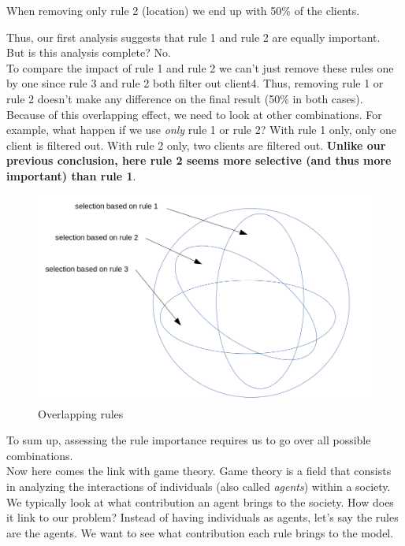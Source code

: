 When removing only rule 2 (location) we end up with 50\% of the clients.

Thus, our first analysis suggests that rule 1 and rule 2 are equally important. \\

But is this analysis complete? No. \\

To compare the impact of rule 1  and rule 2 we can't just remove these rules one by one since rule 3 and rule 2 both filter out client4. Thus, removing rule 1 or rule 2 doesn't make any difference on the final result (50\% in both cases). Because of this overlapping  effect, we need to look at other combinations. For example, what happen if we use \textit{only} rule 1 or rule 2? With rule 1 only, only one client is filtered out. With rule 2 only, two clients are filtered out. \textbf{Unlike our previous conclusion, here rule 2 seems more selective (and thus more important) than rule 1}. \\

\begin{figure}[h]
\begin{center}
\includegraphics[scale=0.3]{./../img/overlaps.png}
\caption{Overlapping rules}
\end{center}
\end{figure}

To sum up, assessing the rule importance requires us to go over all possible combinations. \\

Now here comes the link with game theory. 
Game theory is a field that consists in analyzing the interactions of individuals (also called \textit{agents}) within a society. We typically look at what contribution an agent brings to the society. How does it link to our problem? Instead of having individuals as agents, let's say the rules are the agents. We want to see what contribution each rule brings to the model. \\


